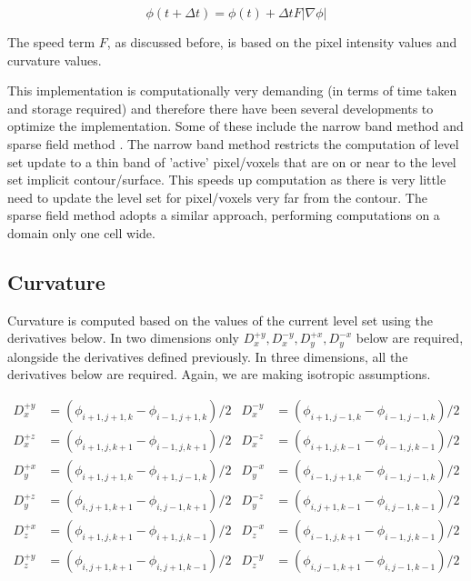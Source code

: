 \begin{equation}
\phi(t+\Delta t) =\phi(t) + \Delta t F|\nabla\phi|
\label{eq:phi}
\end{equation}


The speed term $F$, as discussed before, is based on the pixel intensity values and curvature values. 

This implementation is computationally very demanding (in terms of time taken and storage required) and therefore there have been several developments to optimize the implementation. Some of these include the narrow band method \cite{narrowband} and sparse field method \cite{sparsefield}. The narrow band method restricts the computation of level set update to a thin band of 'active' pixel/voxels that are on or near to the level set implicit contour/surface. This speeds up computation as there is very little need to update the level set for pixel/voxels very far from the contour. The sparse field method adopts a similar approach, performing computations on a domain only one cell wide. 



\subsection{Curvature}
Curvature is computed based on the values of the current level set using the derivatives below. In two dimensions only $D_x^{+y},D_x^{-y},D_y^{+x},D_y^{-x}$ below are required, alongside the derivatives defined previously. In three dimensions, all the derivatives below are required. Again, we are making isotropic assumptions.

\begin{spacing}{1.1}
\begin{align}
	D_x^{+y} &= (\phi_{i+1,j+1,k}-\phi_{i-1,j+1,k})/2 & 	D_x^{-y} &= (\phi_{i+1,j-1,k}-\phi_{i-1,j-1,k})/2 \nonumber\\
	D_x^{+z} &= (\phi_{i+1,j,k+1}-\phi_{i-1,j,k+1})/2 &   D_x^{-z} &= (\phi_{i+1,j,k-1}-\phi_{i-1,j,k-1})/2 \nonumber\\
	D_y^{+x} &= (\phi_{i+1,j+1,k}-\phi_{i+1,j-1,k})/2 & 	D_y^{-x} &= (\phi_{i-1,j+1,k}-\phi_{i-1,j-1,k})/2 \nonumber\\
	D_y^{+z} &= (\phi_{i,j+1,k+1}-\phi_{i,j-1,k+1})/2 &	  D_y^{-z} &= (\phi_{i,j+1,k-1}-\phi_{i,j-1,k-1})/2 \nonumber\\
	D_z^{+x} &= (\phi_{i+1,j,k+1}-\phi_{i+1,j,k-1})/2 & 	D_z^{-x} &= (\phi_{i-1,j,k+1}-\phi_{i-1,j,k-1})/2 \nonumber\\
	D_z^{+y} &= (\phi_{i,j+1,k+1}-\phi_{i,j+1,k-1})/2 &	  D_z^{-y} &= (\phi_{i,j-1,k+1}-\phi_{i,j-1,k-1})/2 \nonumber\\
\end{align}
\end{spacing}

